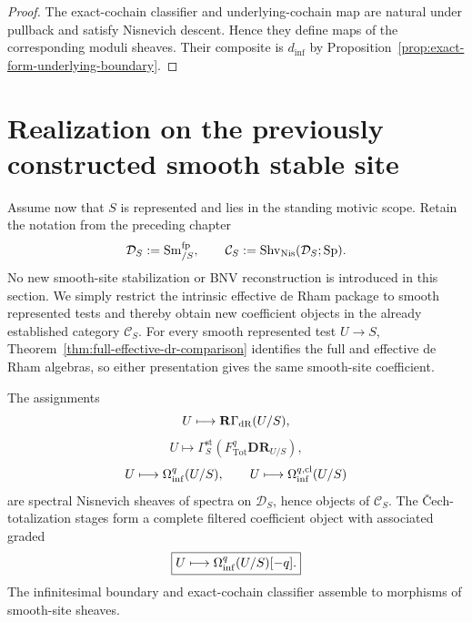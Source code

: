\begin{proof}
The exact-cochain classifier and underlying-cochain map are natural under pullback and satisfy Nisnevich
descent.  Hence they define maps of the corresponding moduli sheaves.  Their composite is
\(d_{\inf}\) by Proposition~\ref{prop:exact-form-underlying-boundary}.
\end{proof}


\section{Realization on the previously constructed smooth stable site}
\label{sec:monadic-de-rham-smooth-site}

Assume now that \(S\) is represented and lies in the standing motivic scope.  Retain the notation
from the preceding chapter
\[
    \mathcal D_S:=\operatorname{Sm}^{\mathrm{fp}}_{/S},
    \qquad
    \mathcal C_S
    :=
    \operatorname{Shv}_{\mathrm{Nis}}(\mathcal D_S;\mathrm{Sp}).
\]
No new smooth-site stabilization or BNV reconstruction is introduced in this section.  We simply
restrict the intrinsic effective de Rham package to smooth represented tests and thereby obtain new coefficient
objects in the already established category \(\mathcal C_S\).
For every smooth represented test \(U\to S\), Theorem~\ref{thm:full-effective-dr-comparison}
identifies the full and effective de Rham algebras, so either presentation gives the same smooth-site
coefficient.

\begin{theorem}
\label{thm:monadic-de-rham-smooth-site-descent}
The assignments
\[
    U\longmapsto\mathbf R\Gamma_{\mathrm{dR}}(U/S),
\]
\[
    U\longmapsto
    \Gamma_S^{\mathrm{st}}
    \left(
        F_{\mathrm{Tot}}^q\mathbf{DR}_{U/S}
    \right),
\]
\[
    U\longmapsto\Omega_{\mathrm{inf}}^q(U/S),
    \qquad
    U\longmapsto\Omega_{\mathrm{inf}}^{q,\mathrm{cl}}(U/S)
\]
are spectral Nisnevich sheaves of spectra on \(\mathcal D_S\), hence objects of
\(\mathcal C_S\).  The \v{C}ech-totalization stages form a complete filtered coefficient object with associated
graded
\[
\boxed{
    U\longmapsto
    \Omega_{\mathrm{inf}}^q(U/S)[-q].
}
\]
The infinitesimal boundary and exact-cochain classifier assemble to morphisms of smooth-site sheaves.
\end{theorem}

